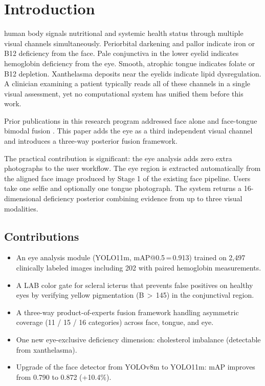 \documentclass[journal]{IEEEtran}
\begin{document}
\section{Introduction}
\label{sec:intro}

 human body signals nutritional and systemic health
status through multiple visual channels simultaneously. Periorbital
darkening and pallor indicate iron or B12 deficiency from the face.
Pale conjunctiva in the lower eyelid indicates hemoglobin deficiency
from the eye. Smooth, atrophic tongue indicates folate or B12 depletion.
Xanthelasma deposits near the eyelids indicate lipid dysregulation.
A clinician examining a patient typically reads all of these channels
in a single visual assessment, yet no computational system has
unified them before this work.

Prior publications in this research program addressed face alone
\cite{muhammad2026facefuel} and face-tongue bimodal fusion
\cite{muhammad2026bimodal}. This paper adds the eye as a third
independent visual channel and introduces a three-way posterior
fusion framework.

The practical contribution is significant: the eye analysis adds zero
extra photographs to the user workflow. The eye region is extracted
automatically from the aligned face image produced by Stage 1 of the
existing face pipeline. Users take one selfie and optionally one tongue
photograph. The system returns a 16-dimensional deficiency posterior
combining evidence from up to three visual modalities.

\subsection*{Contributions}
\begin{itemize}
  \item An eye analysis module (YOLO11m, mAP@0.5\,=\,0.913) trained
    on 2{,}497 clinically labeled images including 202 with paired
    hemoglobin measurements.
  \item A LAB color gate for scleral icterus that prevents false
    positives on healthy eyes by verifying yellow pigmentation
    (B\,$>$\,145) in the conjunctival region.
  \item A three-way product-of-experts fusion framework handling
    asymmetric coverage (11 / 15 / 16 categories) across face,
    tongue, and eye.
  \item One new eye-exclusive deficiency dimension:
    cholesterol imbalance (detectable from xanthelasma).
  \item Upgrade of the face detector from YOLOv8m to YOLO11m:
    mAP improves from 0.790 to 0.872 (+10.4\%).
\end{itemize}
\end{document}
